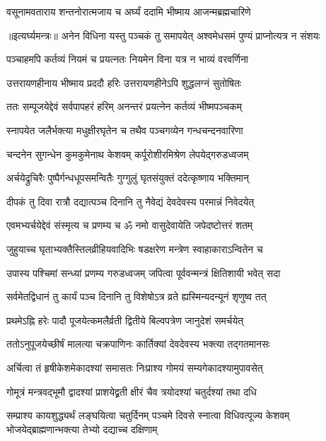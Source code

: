 \twolineshloka
{वसूनामवताराय शन्तनोरात्मजाय च}
{अर्घ्यं ददामि भीष्माय आजन्मब्रह्मचारिणे} %


॥इत्यर्घ्यमन्त्रः॥
\twolineshloka
{अनेन विधिना यस्तु पञ्चकं तु समापयेत्}
{अश्वमेधसमं पुण्यं प्राप्नोत्यत्र न संशयः} %

\twolineshloka
{पञ्चाहमपि कर्तव्यं नियमं च प्रयत्नतः}
{नियमेन विना यत्र न भाव्यं वरवर्णिना} %

\twolineshloka
{उत्तरायणहीनाय भीष्माय प्रददौ हरिः}
{उत्तरायणहीनेऽपि शुद्धलग्नं सुतोषितः} %

\twolineshloka
{ततः सम्पूजयेद्देवं सर्वपापहरं हरिम्}
{अनन्तरं प्रयत्नेन कर्तव्यं भीष्मपञ्चकम्} %

\twolineshloka
{स्नापयेत जलैर्भक्त्या मधुक्षीरघृतेन च}
{तथैव पञ्चगव्येन गन्धचन्दनवारिणा} %

\twolineshloka
{चन्दनेन सुगन्धेन कुमकुमेनाथ केशवम्}
{कर्पूरोशीरमिश्रेण लेपयेद्गरुडध्वजम्} %

\twolineshloka
{अर्चयेद्रुचिरैः पुष्पैर्गन्धधूपसमन्वितैः}
{गुग्गुलुं घृतसंयुक्तं ददेत्कृष्णाय भक्तिमान्} %

\twolineshloka
{दीपकं तु दिवा रात्रौ दद्यात्पञ्च दिनानि तु}
{नैवेद्यं देवदेवस्य परमान्नं निवेदयेत्} %

\twolineshloka
{एवमभ्यर्चयेद्देवं संस्मृत्य च प्रणम्य च}
{ॐ नमो वासुदेवायेति जपेदष्टोत्तरं शतम्} %

\twolineshloka
{जुहुयाच्च घृताभ्यक्तैस्तिलव्रीहियवादिभिः}
{षडक्षरेण मन्त्रेण स्वाहाकाराऽन्वितेन च} %

\twolineshloka
{उपास्य पश्चिमां सन्ध्यां प्रणम्य गरुडध्वजम्}
{जपित्वा पूर्ववन्मन्त्रं क्षितिशायी भवेत् सदा} %

\twolineshloka
{सर्वमेतद्विधानं तु कार्यं पञ्च दिनानि तु}
{विशेषोऽत्र व्रते ह्यस्मिन्यदन्यूनं शृणुष्व तत्} %

\twolineshloka
{प्रथमेऽह्नि हरेः पादौ पूजयेत्कमलैर्व्रती}
{द्वितीये बिल्वपत्रेण जानुदेशं समर्चयेत्} %

\twolineshloka
{ततोऽनुपूजयेच्छीर्षं मालत्या चक्रपाणिनः}
{कार्तिक्यां देवदेवस्य भक्त्या तद्गतमानसः} %

\twolineshloka
{अर्चित्वा तं हृषीकेशमेकादश्यां समासतः}
{निःप्राश्य गोमयं सम्यगेकादश्यामुपावसेत्} %

\twolineshloka
{गोमूत्रं मन्त्रवद्भूमौ द्वादश्यां प्राशयेद्व्रती}
{क्षीरं चैव त्रयोदश्यां चतुर्दश्यां तथा दधि} %

\threelineshloka
{सम्प्राश्य कायशुद्ध्यर्थं लङ्घयित्वा चतुर्दिनम्}
{पञ्चमे दिवसे स्नात्वा विधिवत्पूज्य केशवम्}
{भोजयेद्ब्राह्मणान्भक्त्या तेभ्यो दद्याच्च दक्षिणाम्} %

